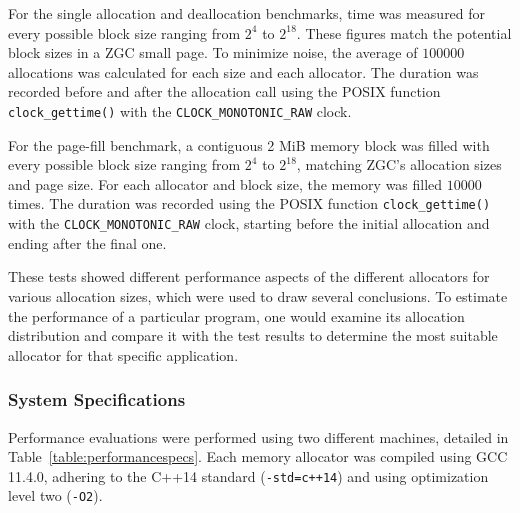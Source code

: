 For the single allocation and deallocation benchmarks, time was measured for every possible block size ranging from $2^4$ to $2^{18}$. These figures match the potential block sizes in a ZGC small page. To minimize noise, the average of $100 000$ allocations was calculated for each size and each allocator. The duration was recorded before and after the allocation call using the POSIX function \texttt{clock\_gettime()} with the \texttt{CLOCK\_MONOTONIC\_RAW} clock.

For the page-fill benchmark, a contiguous 2 MiB memory block was filled with every possible block size ranging from $2^4$ to $2^{18}$, matching ZGC's allocation sizes and page size. For each allocator and block size, the memory was filled $10 000$ times. The duration was recorded using the POSIX function \texttt{clock\_gettime()} with the \texttt{CLOCK\_MONOTONIC\_RAW} clock, starting before the initial allocation and ending after the final one.

These tests showed different performance aspects of the different allocators for various allocation sizes, which were used to draw several conclusions. To estimate the performance of a particular program, one would examine its allocation distribution and compare it with the test results to determine the most suitable allocator for that specific application.

\subsubsection{System Specifications}
Performance evaluations were performed using two different machines, detailed in Table~\ref{table:performancespecs}. Each memory allocator was compiled using GCC 11.4.0, adhering to the C++14 standard (\texttt{-std=c++14}) and using optimization level two (\texttt{-O2}).

